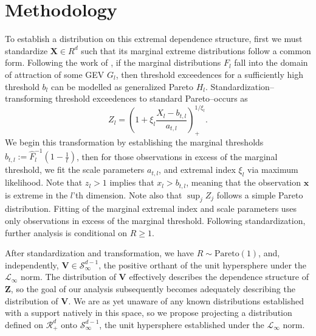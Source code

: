 \section{Methodology}
To establish a distribution on this extremal dependence structure, first we must standardize $\bm{X} \in R^d$
  such that its marginal extreme distributions follow a common form.  Following the work of
  \cite{ferreira2014}, if the marginal distributions $F_{l}$ fall into the domain
  of attraction of some GEV $G_l$, then threshold exceedences for a sufficiently high threshold $b_{l}$
  can be modelled as generalized Pareto $H_l$.  Standardization--transforming threshold exceedences to
  standard Pareto--occurs as
  \begin{equation}
    \label{eqn:standardization}
    Z_l = \left(1 + \xi_l\frac{X_l - b_{t,l}}{a_{t,l}}\right)_{+}^{1/\xi_l}.
  \end{equation}
  We begin this transformation by establishing the marginal thresholds
  $b_{t,l} := \hat{F}_l^{-1}\left(1 - \frac{1}{t}\right)$, then for those observations in excess of
  the marginal threshold, we fit the scale parameters $a_{t,l}$, and extremal index $\xi_l$ via
  maximum likelihood. Note that $z_l > 1$ implies that $x_l > b_{t,l}$, meaning that the observation
  $\bm{x}$ is extreme in the $l$'th dimension.  Note also that $\sup_j Z_j$ follows a simple Pareto
  distribution. Fitting of the marginal extremal index and scale parameters uses only observations in
  excess of the marginal threshold. Following standardization, further analysis is conditional on
  $R \geq 1$.

After standardization and transformation, we have $R\sim\text{Pareto}(1)$, and, independently,
  $\bm{V}\in\mathcal{S}_{\infty}^{d-1}$, the positive orthant of the unit hypersphere under the
  $\mathcal{L}_{\infty}$ norm.  The distribution of $\bm{V}$ effectively describes the dependence
  structure of $\bm{Z}$, so the goal of our analysis subsequently becomes adequately describing the
  distribution of $\bm{V}$.  We are as yet unaware of any known distributions established with a support
  natively in this space, so we propose projecting a distribution defined on $\mathcal{R}_{+}^{d}$ onto
  $\mathcal{S}_{\infty}^{d-1}$, the unit hypersphere established under the $\mathcal{L}_{\infty}$ norm.







